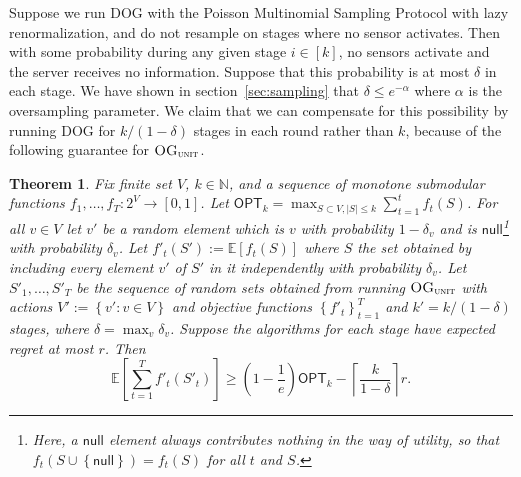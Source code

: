 \documentclass{sig-alternate-dan}
\numberwithin{equation}{section}
\newcommand{\algofont}[1]{\textsc{#1}}
\newcommand{\OGunit}{$\algofont{OG}_{\algofont{unit}}$\xspace}
\newcommand{\dog}{\algofont{DOG}\xspace}
\newcommand{\sensor}{\ensuremath{v}}
\newcommand{\sensors}{V}
\newcommand{\OPT}{\textsf{OPT}}
\newcommand{\NULL}{\textsf{null}}
\newcommand{\K}{\ensuremath{k}}
\newcommand{\LimitProtocol}[0]{Poisson Multinomial Sampling
  Protocol\xspace}
\newcommand{\nats}{\ensuremath{\mathbb{N}}}
\newcommand{\paren} [1] {\ensuremath{ \left( {#1} \right) }}
\newcommand{\set}[1]{\ensuremath{\left\{#1\right\}}}
\newcommand{\E}[1]{\ensuremath{\mathbb{E}\left[#1\right] }}
\newcommand{\ceil}[1]{\ensuremath{\left\lceil#1\right\rceil}}
\newtheorem{theorem}{Theorem}
\begin{document}
{Suppose we run \dog with the \LimitProtocol with lazy renormalization,
and do not resample on stages where no sensor activates.
Then with some probability during any given stage $i \in [\K]$, no
sensors activate and the server receives no information.
Suppose that this probability is at most $\delta$ in each stage.
We have shown in section~\ref{sec:sampling} that $\delta \le e^{-\alpha}$ where $\alpha$ is the
oversampling parameter.  We claim that we can compensate for this
possibility by running \dog for $\K/(1-\delta)$ stages in each round
rather than $\K$, because of the following guarantee for \OGunit.

\begin{theorem} \label{thm:faulty-sensors}
Fix finite set $\sensors$, $\K \in \nats$, and a sequence of 
monotone submodular functions $f_1, \ldots, f_T:2^{\sensors} \to [0,1]$.
Let $\OPT_{\K} = \max_{S \subset \sensors, |S| \le \K} \sum_{t=1}^{t} f_t(S)$.
For all $\sensor \in \sensors$ let $\sensor'$ be a random element which is 
$v$ with probability $1-\delta_\sensor$ and is $\NULL$\footnote{Here,
  a $\NULL$ element always contributes nothing in the way of utility,
  so that $f_t(S \cup \set{\NULL}) = f_t(S)$ for all $t$ and $S$.}
 with probability
$\delta_\sensor$.  
Let $f'_t(S') := \E{f_t(S)}$ where $S$ the set obtained
by including every element $\sensor'$ of $S'$ in it independently with
probability $\delta_{\sensor}$.
Let $S'_1, \ldots, S'_T$ be the sequence of random sets obtained from
running \OGunit with actions $\sensors' := \set{\sensor' : \sensor \in
  V}$ and objective functions $\set{f'_t}_{t = 1}^T$ and $\K' =
\K/(1-\delta)$ stages, where $\delta = \max_{\sensor}
\delta_{\sensor}$.
Suppose the algorithms for each stage have expected regret at most $r$.
Then 
\[
\E{\sum_{t=1}^T f'_t(S'_t)} \ge \paren{1-\frac{1}{e}}\OPT_{\K} - \ceil{\frac{\K}{1-\delta}} r\mbox{.}
\]
\end{theorem}
 
}
\end{document}
